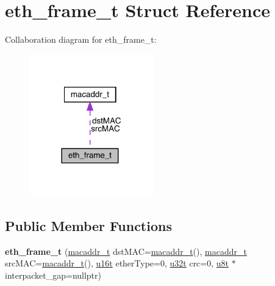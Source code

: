 \hypertarget{structeth__frame__t}{}\section{eth\+\_\+frame\+\_\+t Struct Reference}
\label{structeth__frame__t}


Collaboration diagram for eth\+\_\+frame\+\_\+t\+:\nopagebreak
\begin{figure}[H]
\begin{center}
\leavevmode
\includegraphics[width=153pt]{structeth__frame__t__coll__graph}
\end{center}
\end{figure}
\subsection*{Public Member Functions}
\begin{DoxyCompactItemize}
\item 
\mbox{\label{structeth__frame__t_a8617affa4463b4e4b29484ddc6704ae1}} 
{\bfseries eth\+\_\+frame\+\_\+t} (\hyperlink{structmacaddr__t}{macaddr\+\_\+t} dst\+M\+AC=\hyperlink{structmacaddr__t}{macaddr\+\_\+t}(), \hyperlink{structmacaddr__t}{macaddr\+\_\+t} src\+M\+AC=\hyperlink{structmacaddr__t}{macaddr\+\_\+t}(), \hyperlink{macros_8h_a590a9a8f7df8fabfac6573e21da1922d}{u16t} ether\+Type=0, \hyperlink{macros_8h_a464a07ed2c6d005d677113cc44750a64}{u32t} crc=0, \hyperlink{macros_8h_a176a4ab0531a048e0693a4520c550193}{u8t} $\ast$interpacket\+\_\+gap=nullptr)
\end{DoxyCompactItemize}
